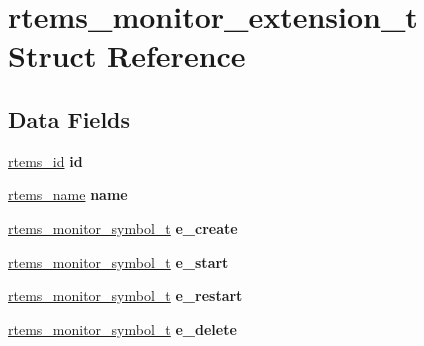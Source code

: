\hypertarget{structrtems__monitor__extension__t}{}\section{rtems\+\_\+monitor\+\_\+extension\+\_\+t Struct Reference}
\label{structrtems__monitor__extension__t}
\subsection*{Data Fields}
\begin{DoxyCompactItemize}
\item 
\mbox{\label{structrtems__monitor__extension__t_a81ecf3bb64e3747e6e385892f081122e}} 
\mbox{\hyperlink{group__ClassicTasks_gab20892b814dced7dd4e5b9bf42becd57}{rtems\+\_\+id}} {\bfseries id}
\item 
\mbox{\label{structrtems__monitor__extension__t_a8298bdb7448fea6eb1db0e9a7ee8ed3d}} 
\mbox{\hyperlink{group__ClassicTasks_ga55fb63c49f68c0cbd9bee004da15b1fd}{rtems\+\_\+name}} {\bfseries name}
\item 
\mbox{\label{structrtems__monitor__extension__t_ab418d2e7a63c1b21174e552eec03fddc}} 
\mbox{\hyperlink{structrtems__monitor__symbol__t}{rtems\+\_\+monitor\+\_\+symbol\+\_\+t}} {\bfseries e\+\_\+create}
\item 
\mbox{\label{structrtems__monitor__extension__t_af73d1ca935c8d508ce40c626e2db985b}} 
\mbox{\hyperlink{structrtems__monitor__symbol__t}{rtems\+\_\+monitor\+\_\+symbol\+\_\+t}} {\bfseries e\+\_\+start}
\item 
\mbox{\label{structrtems__monitor__extension__t_a3c6f821bceb2cf72d1099b4ae28c0769}} 
\mbox{\hyperlink{structrtems__monitor__symbol__t}{rtems\+\_\+monitor\+\_\+symbol\+\_\+t}} {\bfseries e\+\_\+restart}
\item 
\mbox{\label{structrtems__monitor__extension__t_a79da3f265f4e70d3c954805d125c27f7}} 
\mbox{\hyperlink{structrtems__monitor__symbol__t}{rtems\+\_\+monitor\+\_\+symbol\+\_\+t}} {\bfseries e\+\_\+delete}

\end{DoxyCompactItemize}
